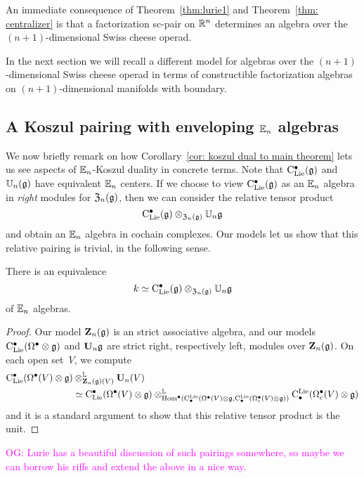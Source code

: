\documentclass[11pt]{amsart}
\numberwithin{equation}{section}
\def\owen{\textcolor{magenta}{OG: }\textcolor{magenta}}
\begin{document}
An immediate consequence of Theorem~\ref{thm:lurie1} and Theorem~\ref{thm: centralizer} is that a factorization sc-pair on $\mathbb R^n$ determines an algebra over the $(n+1)$-dimensional Swiss cheese operad. 

In the next section we will recall a different model for algebras over the $(n+1)$-dimensional Swiss cheese operad in terms of constructible factorization algebras on $(n+1)$-dimensional manifolds with boundary. 

\subsection{A Koszul pairing with enveloping $\mathbb E_n$ algebras}

We now briefly remark on how Corollary~\ref{cor: koszul dual to main theorem} lets us see aspects of $\mathbb E_n$-Koszul duality in concrete terms.
Note that ${\rm C}_{\rm Lie}^\bullet(\mathfrak g)$ and $\mathbb U_n(\mathfrak g)$ have equivalent $\mathbb E_n$ centers.
If we choose to view ${\rm C}_{\rm Lie}^\bullet(\mathfrak g)$ as an $\mathbb E_n$ algebra in {\em right} modules for ${\frak Z}_n(\mathfrak g)$,
then we can consider the relative tensor product
\[
{\rm C}_{\rm Lie}^\bullet(\mathfrak g) \otimes_{{\frak Z}_n(\mathfrak g)} \mathbb U_n \mathfrak g
\]
and obtain an $\mathbb E_n$ algebra in cochain complexes.
Our models let us show that this relative pairing is trivial, in the following sense.

\begin{lmm}
There is an equivalence  
\[
k \simeq {\rm C}_{\rm Lie}^\bullet(\mathfrak g) \otimes_{{\frak Z}_n(\mathfrak g)} \mathbb U_n \mathfrak g
\]
of $\mathbb E_n$ algebras.
\end{lmm}

\begin{proof}
Our model $\mathbf Z_n(\mathfrak g)$ is an strict associative algebra, and our models ${\rm C}_{\rm Lie}^\bullet(\Omega^\bullet \otimes \mathfrak g)$ and $\mathbf U_n\mathfrak g$ are strict right, respectively left, modules over $\mathbf Z_n(\mathfrak g)$.
On each open set~$V$, we compute
\begin{align*}
{\rm C}_{\rm Lie}^\bullet(\Omega^\bullet(V) \otimes \mathfrak g) &\otimes^\mathbb L_{\mathbf Z_n(\mathfrak g)(V)} \mathbf U_n(V) \\
&\simeq {\rm C}_{\rm Lie}^\bullet(\Omega^\bullet(V) \otimes \mathfrak g) \otimes^\mathbb L_{{\rm Hom}^\bullet({\rm C}^{\rm Lie}_\bullet(\Omega^\bullet(V) \otimes \mathfrak g, {\rm C}^{\rm Lie}_\bullet(\Omega^\bullet_c(V)\otimes \mathfrak g))} {\rm C}^{\rm Lie}_\bullet(\Omega^\bullet_c(V)\otimes \mathfrak g)
\end{align*}
and it is a standard argument to show that this relative tensor product is the unit.
\end{proof}

\owen{Lurie has a beautiful discussion of such pairings somewhere,
so maybe we can borrow his riffs and extend the above in a nice way.}
\end{document}
